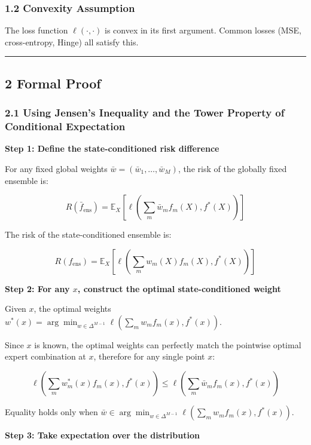 \documentclass[
  12pt,
]{article}
\begin{document}
\subsubsection{1.2 Convexity Assumption}\label{convexity-assumption}

The loss function \(\ell(\cdot, \cdot)\)
is convex in its first argument. Common losses (MSE, cross-entropy, Hinge) all satisfy this.

\begin{center}\rule{0.5\linewidth}{0.5pt}\end{center}

\subsection{2 Formal Proof}\label{formal-proof}

\subsubsection{2.1 Using Jensen's Inequality and the Tower Property of Conditional Expectation}\label{using-jensen}

\textbf{Step 1: Define the state-conditioned risk difference}

For any fixed global weights
\(\bar{w} = (\bar{w}_1, \ldots, \bar{w}_M)\), the risk of the globally fixed ensemble is:

\[R(\bar{f}_{\text{ens}}) = \mathbb{E}_X\left[\ell\left(\sum_m \bar{w}_m f_m(X), f^*(X)\right)\right]\]

The risk of the state-conditioned ensemble is:

\[R(f_{\text{ens}}) = \mathbb{E}_X\left[\ell\left(\sum_m w_m(X) f_m(X), f^*(X)\right)\right]\]

\textbf{Step 2: For any \(x\), construct the optimal state-conditioned weight}

Given \(x\), the optimal weights
\(w^*(x) = \arg\min_{w \in \Delta^{M-1}} \ell(\sum_m w_m f_m(x), f^*(x))\).

Since \(x\) is known, the optimal weights can perfectly match the pointwise optimal expert combination at \(x\), therefore for any single point \(x\):

\[\ell\left(\sum_m w_m^*(x) f_m(x), f^*(x)\right) \leq \ell\left(\sum_m \bar{w}_m f_m(x), f^*(x)\right)\]

Equality holds only when
\(\bar{w} \in \arg\min_{w \in \Delta^{M-1}} \ell(\sum_m w_m f_m(x), f^*(x))\).

\textbf{Step 3: Take expectation over the distribution}
\end{document}
